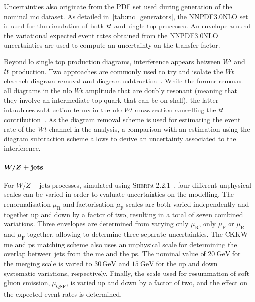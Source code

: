  Uncertainties also originate from the \gls{PDF} set used during generation of the nominal \gls{mc} dataset.
 As detailed in~\cref{tab:mc_generators}, the \textsc{NNPDF3.0NLO} set is used for the simulation of both $t\bar{t}$ and single top processes.
 An envelope around the variational expected event rates obtained from the \textsc{NNPDF3.0NLO} uncertainties are used to compute an uncertainty on the transfer factor.
 
 Beyond \gls{lo} single top production diagrams, interference appears between $Wt$ and $t\bar{t}$ production.
 Two approaches are commonly used to try and isolate the $Wt$ channel: diagram removal and diagram subtraction~\cite{Frixione:2008yi}.
 While the former removes all diagrams in the \gls{nlo} $Wt$ amplitude that are doubly resonant (meaning that they involve an intermediate top quark that can be on-shell), the latter introduces subtraction terms in the \gls{nlo} $Wt$ cross section cancelling the $t\bar{t}$ contribution~\cite{Frixione:2008yi}.
 As the diagram removal scheme is used for estimating the event rate of the $Wt$ channel in the analysis, a comparison with an estimation using the diagram subtraction scheme allows to derive an uncertainty associated to the interference.
  
 \subsubsection{$\makemebold{W/Z+\mathrm{jets}}$}
 
 For $W/Z+\mathrm{jets}$ processes, simulated using \textsc{Sherpa 2.2.1}~\cite{Gleisberg:2008ta,Bothmann:2019yzt}, four different unphysical scales can be varied in order to evaluate uncertainties on the modelling.
 The renormalisation $\mu_\mathrm{R}$ and factorisation $\mu_\mathrm{F}$ scales are both varied independently and together up and down by a factor of two, resulting in a total of seven combined variations.
 Three envelopes are determined from varying only $\mu_\mathrm{R}$, only $\mu_\mathrm{F}$ or $\mu_\mathrm{R}$ and $\mu_\mathrm{F}$ together, allowing to determine three separate uncertainties.
 The CKKW \gls{me} and \gls{ps} matching scheme also uses an unphysical scale for determining the overlap between jets from the \gls{me} and the \gls{ps}.
 The nominal value of $\SI{20}{\GeV}$ for the merging scale is varied to $\SI{30}{\GeV}$ and $\SI{15}{\GeV}$ for the up and down systematic variations, respectively.
 Finally, the scale used for resummation of soft gluon emission, $\mu_\mathrm{QSF}$, is varied up and down by a factor of two, and the effect on the expected event rates is determined.
 
